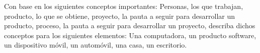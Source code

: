 Con base en los siguientes conceptos importantes: Personas, los que trabajan, producto, lo que se obtiene, proyecto, la pauta a seguir para desarrollar un producto, proceso, la pauta a seguir para desarrollar un proyecto, describa dichos conceptos para los siguientes elementos: Una computadora, un producto software, un dispositivo móvil, un automóvil, una casa, un escritorio.
